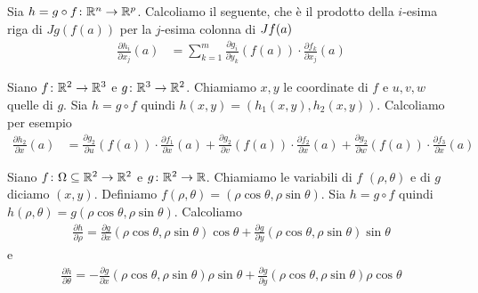 \documentclass[a4paper]{article}
\begin{document}
\begin{radioactive}
Sia \(h = g\circ f \colon \mathbb{R}^n \to \mathbb{R}^p\).
Calcoliamo il seguente, che è il prodotto della \(i\)-esima riga di \(Jg(f(a))\)
per la \(j\)-esima colonna di \(J f(a)\)
\begin{align*}
    \frac{\partial h_i}{\partial x_j}(a)
    &= \sum_{k=1}^m \frac{\partial g_i}{\partial y_k} (f(a))
    \cdot \frac{\partial f_k}{\partial x_j}(a)
\end{align*}

\begin{snippetexample}{}
    Siano \(f\colon \mathbb{R}^2 \to \mathbb{R}^3\) e 
    \(g\colon \mathbb{R}^3 \to \mathbb{R}^2\). Chiamiamo \(x,y\) le coordinate di \(f\)
    e \(u, v, w\) quelle di \(g\). Sia \(h = g \circ f\) quindi \(h(x,y) = (h_1(x,y), h_2(x,y))\).
    Calcoliamo per esempio
    \begin{align*}
        \frac{\partial h_2}{\partial x}(a)
        &= \frac{\partial g_2}{\partial u}(f(a))
        \cdot \frac{\partial f_1}{\partial x}(a)
        + \frac{\partial g_2}{\partial v}(f(a)) \cdot
        \frac{\partial f_2}{\partial x}(a)
        + \frac{\partial g_2}{\partial w}(f(a))
        \cdot \frac{\partial f_3}{\partial x}(a)
    \end{align*}
\end{snippetexample}
\end{radioactive}

\begin{radioactive}
\begin{snippetexample}{}
    Siano \(f\colon \Omega \subseteq \mathbb{R}^2 \to \mathbb{R}^2\) e 
    \(g\colon \mathbb{R}^2 \to \mathbb{R}\). Chiamiamo le variabili di \(f\)
    \((\rho, \theta)\) e di \(g\) diciamo \((x,y)\).
    Definiamo \(f(\rho, \theta) = (\rho\cos\theta,\rho\sin\theta)\).
    Sia \(h = g \circ f\) quindi \(h(\rho, \theta) = g(\rho\cos\theta, \rho\sin\theta)\).
    Calcoliamo
    \begin{align*}
        \frac{\partial h}{\partial \rho}
        = \frac{\partial g}{\partial x}(\rho\cos\theta, \rho\sin\theta) \cos\theta
        + \frac{\partial g}{\partial y}(\rho\cos\theta, \rho\sin\theta) \sin\theta
    \end{align*}
    e
    \begin{align*}
        \frac{\partial h}{\partial \theta}
        = -\frac{\partial g}{\partial x}(\rho\cos\theta, \rho\sin\theta) \rho\sin\theta
        + \frac{\partial g}{\partial y}(\rho\cos\theta, \rho\sin\theta) \rho\cos\theta
    \end{align*}
\end{snippetexample}
\end{radioactive}
\end{document}
